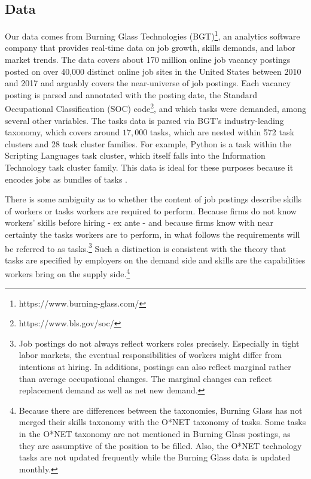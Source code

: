\documentclass[letterpaper]{article} %
\begin{document}
\subsection{Data}
\label{subsec:data} Our data comes from Burning Glass Technologies (BGT)\footnote{https://www.burning-glass.com/}, an analytics software company that provides real-time data on job growth, skills demands, and labor market trends. The data covers about 170 million online job vacancy postings posted on over 40,000 distinct online job sites in the United States between 2010 and 2017 and arguably covers the near-universe of job postings. Each vacancy posting is parsed and annotated with the posting date, the Standard Occupational Classification (SOC) code\footnote{https://www.bls.gov/soc/}, and which tasks were demanded, among several other variables. The tasks data is parsed via BGT's industry-leading taxonomy, which covers around $17,000$ tasks, which are nested within 572 task clusters and 28 task cluster families. For example, Python is a task within the Scripting Languages task cluster, which itself falls into the Information Technology task cluster family. This data is ideal for these purposes because it encodes jobs as bundles of tasks \cite{Deming2018}. 

There is some ambiguity as to whether the content of job postings describe skills of workers or tasks workers are required to perform. Because firms do not know workers' skills before hiring - ex ante - and because firms know with near certainty the tasks workers are to perform, in what follows the requirements will be referred to as tasks.\footnote{Job postings do not always reflect workers roles precisely. Especially in tight labor markets, the eventual responsibilities of workers might differ from intentions at hiring. In additions, postings can also reflect marginal rather than average occupational changes. The marginal changes can reflect replacement demand as well as net new demand.} Such a distinction is consistent with the theory that tasks are specified by employers on the demand side and skills are the capabilities workers bring on the supply side.\footnote{Because there are differences between the taxonomies, Burning Glass has not merged their skills taxonomy with the O*NET taxonomy of tasks. Some tasks in the O*NET taxonomy are not mentioned in Burning Glass postings, as they are assumptive of the position to be filled. Also, the O*NET technology tasks are not updated frequently while the Burning Glass data is updated monthly.}
\end{document}
